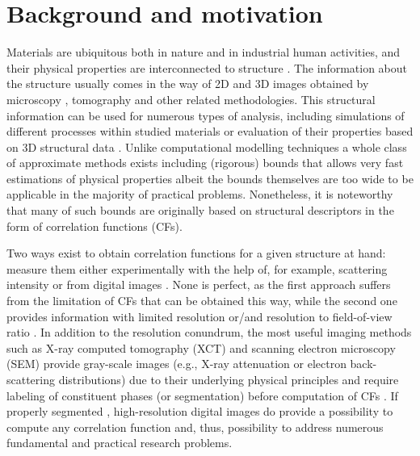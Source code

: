 \documentclass[1p]{elsarticle}
\begin{document}
\maketitle

\section{Background and motivation}
\label{sec:background}
Materials are ubiquitous both in nature and in industrial human activities, and
their physical properties are interconnected to structure
\cite{Torquato_book,Sahimi_book}. The information about the structure usually
comes in the way of 2D and 3D images obtained by microscopy
\cite{moussaoui2018,neumann2019,FIB-SEMpaper}, tomography \cite{xctmat_book} and
other related methodologies.  This structural information can be used for
numerous types of analysis, including simulations of different processes within
studied materials or evaluation of their properties based on 3D structural data
\cite{youssef2005,Miao2017,FDMSS}. Unlike computational modelling techniques a
whole class of approximate methods exists including (rigorous) bounds that
allows very fast estimations of physical properties
\cite{eshelby1957,berryman1986use,rozanski2023} albeit the bounds themselves are
too wide to be applicable in the majority of practical problems. Nonetheless, it
is noteworthy that many of such bounds are originally based on structural
descriptors in the form of correlation functions (CFs).

Two ways exist to obtain correlation functions for a given structure at hand:
measure them either experimentally with the help of, for example, scattering
intensity \cite{debye1957scattering,li2018direct} or from digital images
\cite{berryman1985measurement,ma2018SS}. None is perfect, as the first approach
suffers from the limitation of CFs that can be obtained this way, while the
second one provides information with limited resolution or/and resolution to
field-of-view ratio \cite{gerke2015universal}. In addition to the resolution
conundrum, the most useful imaging methods such as X-ray computed tomography
(XCT) and scanning electron microscopy (SEM) provide gray-scale images (e.g.,
X-ray attenuation or electron back-scattering distributions) due to their
underlying physical principles and require labeling of constituent phases (or
segmentation) before computation of CFs \cite{samarin2023robust}. If properly
segmented \cite{NNseg}, high-resolution digital images do provide a possibility
to compute any correlation function and, thus, possibility to address numerous
fundamental and practical research problems.
\end{document}

